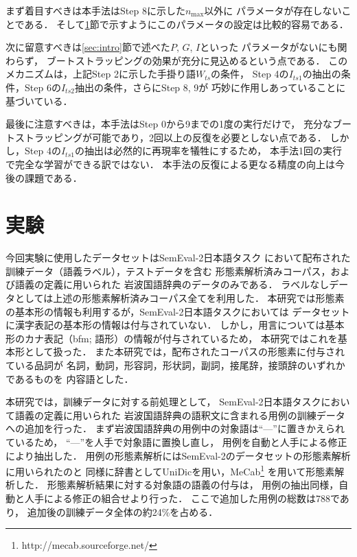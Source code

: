 \documentclass[japanese]{jnlp_1.4}
\begin{document}
まず着目すべきは本手法はStep 8に示した$n_{\max}$以外に
パラメータが存在しないことである．
そして\ref{sec:exp}節で示すようにこのパラメータの設定は比較的容易である．

次に留意すべきは\ref{sec:intro}節で述べた$P$, $G$, $I$といった
パラメータがないにも関わらず，
ブートストラッピングの効果が充分に見込めるという点である．
このメカニズムは，上記Step 2に示した手掛り語$W_{ts}$の条件，
Step 4の$I_{ts1}$の抽出の条件，Step 6の$I_{ts2}$抽出の条件，さらにStep 8, 9が
巧妙に作用しあっていることに基づいている．

最後に注意すべきは，本手法はStep 0から9までの1度の実行だけで，
充分なブートストラッピングが可能であり，2回以上の反復を必要としない点である．
しかし，Step 4の$I_{ts1}$の抽出は必然的に再現率を犠牲にするため，
本手法1回の実行で完全な学習ができる訳ではない．
本手法の反復による更なる精度の向上は今後の課題である．



\section{実験}
\label{sec:exp}

今回実験に使用したデータセットはSemEval-2日本語タスク\cite{Okumura10}
において配布された訓練データ（語義ラベル），テストデータを含む
形態素解析済みコーパス，および語義の定義に用いられた
岩波国語辞典\cite{Nishio94}のデータのみである．
ラベルなしデータとしては上述の形態素解析済みコーパス全てを利用した．
本研究では形態素の基本形の情報も利用するが，SemEval-2日本語タスクにおいては
データセットに漢字表記の基本形の情報は付与されていない．
しかし，用言については基本形のカナ表記（bfm; 語形）の情報が付与されているため，
本研究ではこれを基本形として扱った．
また本研究では，配布されたコーパスの形態素に付与されている品詞が
名詞，動詞，形容詞，形状詞，副詞，接尾辞，接頭辞のいずれかであるものを
内容語とした．

本研究では，訓練データに対する前処理として，
SemEval-2日本語タスクにおいて語義の定義に用いられた
岩波国語辞典の語釈文に含まれる用例の訓練データへの追加を行った．
まず岩波国語辞典の用例中の対象語は``—''に置きかえられているため，
``—''を人手で対象語に置換し直し，
用例を自動と人手による修正により抽出した．
用例の形態素解析にはSemEval-2のデータセットの形態素解析に用いられたのと
同様に辞書としてUniDicを用い，MeCab\footnote{http://mecab.sourceforge.net/}
を用いて形態素解析した．
形態素解析結果に対する対象語の語義の付与は，
用例の抽出同様，自動と人手による修正の組合せより行った．
ここで追加した用例の総数は788であり，
追加後の訓練データ全体の約24\%を占める．
\end{document}
